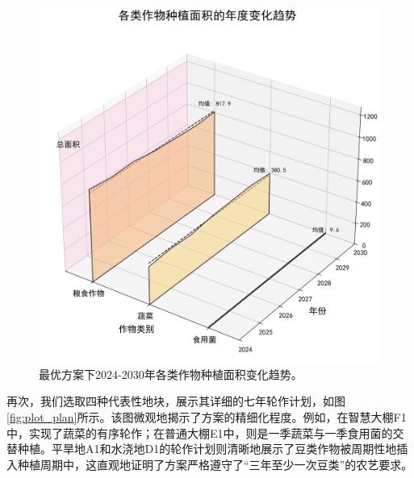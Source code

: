\begin{figure}[H]
    \centering
    \includegraphics[width=\textwidth]{figs/5问题三/年度种植面积3D图.png}
    \caption{最优方案下2024-2030年各类作物种植面积变化趋势。}
    \label{fig:area_stack}
\end{figure}

再次，我们选取四种代表性地块，展示其详细的七年轮作计划，如图\ref{fig:plot_plan}所示。该图微观地揭示了方案的精细化程度。例如，在智慧大棚F1中，实现了蔬菜的有序轮作；在普通大棚E1中，则是一季蔬菜与一季食用菌的交替种植。平旱地A1和水浇地D1的轮作计划则清晰地展示了豆类作物被周期性地插入种植周期中，这直观地证明了方案严格遵守了“三年至少一次豆类”的农艺要求。

